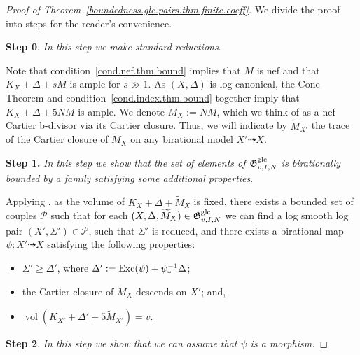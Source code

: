 \documentclass[12pt, a4paper]{amsart}
\DeclareMathOperator{\vol}{\mathrm{vol}}
\newcommand{\setgpairsdcc}[1]{\mathfrak G^{\rm g#1}_{v, I, N}}
\newcounter{Theorem}
\theoremstyle{definition}
\theoremstyle{named}
\begin{document}
\begin{proof}[Proof of Theorem~\ref{boundedness.glc.pairs.thm.finite.coeff}]

We divide the proof into steps for the reader's convenience.

\medskip

{\bf Step 0}.
{\it In this step we make standard reductions}.

Note that condition~\eqref{cond.nef.thm.bound} implies that 
$M$ 
is nef and that 
$K_X+\Delta+sM$
is ample for
$s \gg 1$.
As 
$(X, \Delta)$ 
is log canonical, the Cone Theorem 
\cite[Theorem 5.6]{MR4298910} 
and condition~\eqref{cond.index.thm.bound} together imply that 
$K_X+\Delta+ 5NM$ 
is ample.
We denote 
$\widetilde{M}_X:=NM$, which we think of as a nef Cartier b-divisor via its Cartier closure.
Thus, we will indicate by 
$\widetilde{M}_{X'}$ the trace of the Cartier closure of 
$\widetilde{M}_X$
on any birational model 
$X'\dashrightarrow X$.


\medskip

{\bf Step 1.}
{\it In this step we show that the set of elements of 
$\setgpairsdcc{lc}$
is birationally bounded by a family satisfying some additional properties}.

Applying \cite[Proposition 5.2]{bir.2103},
as the volume of 
$K_X+\Delta+\widetilde{M}_X$ 
is fixed, 
there exists a bounded set of couples 
$\mathcal{P}$ 
such that for each 
$(X, \Delta, \widetilde{M}_X) \in \setgpairsdcc{lc}$ 
we can find a 
log smooth log pair 
$(X',\Sigma')\in \mathcal{P}$,
such that  
$\Sigma'$ is reduced,
and there exists a birational map 
$\psi \colon X' \dashrightarrow X$ 
satisfying the following properties:
\begin{itemize}
\item 
$\Sigma' \ge \Delta'$, 
where 
$\Delta' := {\rm Exc}(\psi) + \psi_\ast^{-1} \Delta$;

\item  
the Cartier closure of 
$\widetilde{M}_X$  
descends 
on
$X'$; and, 
\item
$\vol(K_{X'}+\Delta'+5\widetilde{M}_{X'})=v$.
\end{itemize}

\medskip

{\bf Step 2}.
{\it In this step we show that we can assume that 
$\psi$
is a morphism.}


\end{proof}
\end{document}
